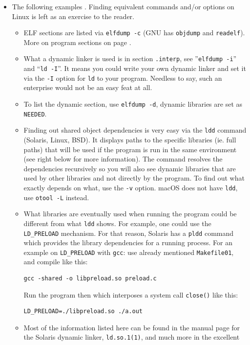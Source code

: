 \begin{itemize}
\item The following examples .  Finding equivalent
commands and/or options on Linux is left as an exercise to the reader.
\begin{itemize}
\item ELF sections are listed via \texttt{elfdump -c} (GNU has
\texttt{objdump} and \texttt{readelf}).  More on program sections on page
\pageref{ELF}.
\item What a dynamic linker is used is in section \texttt{.interp}, see
''\texttt{elf\-dump -i}'' and ``\texttt{ld -I}''.  It means you could write your
own dynamic linker and set it via the \texttt{-I} option for \texttt{ld} to your
program.  Needless to say, such an enterprise would not be an easy feat at
all.
\item To list the dynamic section, use \texttt{elfdump -d}, dynamic libraries
are set as \texttt{NEEDED}.
\item Finding out shared object dependencies is very easy via the
\texttt{ldd} command (Solaris, Linux, BSD).  It displays paths to the specific
libraries (ie. full paths) that will be used if the program is run in the
same environment (see right below for more information).  The command resolves
the dependencies recursively so you will also see dynamic libraries that are used
by other libraries and not directly by the program.  To find out what exactly
depends on what, use the \texttt{-v} option.  macOS does not have \texttt{ldd},
use \texttt{otool -L} instead.
\item What libraries are eventually used when running the program could be
different from what \texttt{ldd} shows.  For example, 
one could use the \texttt{LD\_PRELOAD} mechanism.  For that reason,
Solaris has a \texttt{pldd} command which provides the library dependencies for
a running process.  For an example on \texttt{LD\_PRELOAD} with \texttt{gcc}:
use already mentioned \texttt{Ma\-ke\-file01}, and compile
 like this:
\begin{verbatim}
gcc -shared -o libpreload.so preload.c
\end{verbatim}
Run the program then which interposes a system
call \texttt{close()} like this:
\begin{verbatim}
LD_PRELOAD=./libpreload.so ./a.out
\end{verbatim}
\item Most of the information listed here can be found in the manual page for the
Solaris dynamic linker, \texttt{ld.so.1(1)}, and much more in the excellent

\end{itemize}
\end{itemize}
